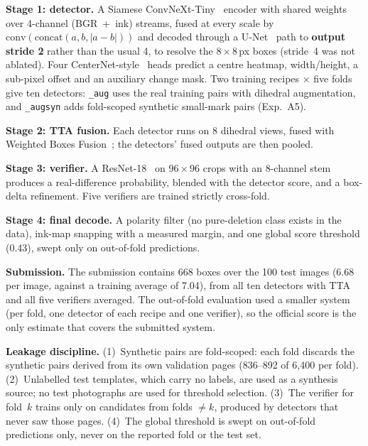 \noindent\textbf{Stage 1: detector.} A Siamese ConvNeXt-Tiny~\cite{liu2022convnext} encoder with
shared weights over 4-channel (BGR~+~ink) streams, fused at every scale by
$\mathrm{conv}(\mathrm{concat}(a,b,|a-b|))$ and decoded through a
U-Net~\cite{ronneberger2015unet} path to \textbf{output stride 2} rather than the usual
4, to resolve the $8\times8$\,px boxes (stride~4 was not ablated). Four
CenterNet-style~\cite{zhou2019centernet} heads predict a centre heatmap, width/height,
a sub-pixel offset and an auxiliary change mask. Two training recipes $\times$ five
folds give ten detectors: \texttt{\_aug} uses the real training pairs with dihedral
augmentation, and \texttt{\_augsyn} adds fold-scoped synthetic small-mark pairs
(Exp.~A5).

\noindent\textbf{Stage 2: TTA fusion.} Each detector runs on 8 dihedral views, fused with Weighted
Boxes Fusion~\cite{solovyev2021wbf}; the detectors' fused outputs are then pooled.

\noindent\textbf{Stage 3: verifier.} A ResNet-18~\cite{he2016resnet} on $96\times96$ crops with an
8-channel stem produces a real-difference probability, blended with the detector
score, and a box-delta refinement. Five verifiers are trained strictly cross-fold.

\noindent\textbf{Stage 4: final decode.} A polarity filter (no pure-deletion class exists in the
data), ink-map snapping with a measured margin, and one global score threshold (0.43),
swept only on out-of-fold predictions.

\noindent\textbf{Submission.} The submission contains 668 boxes over the 100 test
images (6.68 per image, against a training average of 7.04), from all ten detectors
with TTA and all five verifiers averaged. The out-of-fold evaluation used a smaller
system (per fold, one detector of each recipe and one verifier), so the official score
is the only estimate that covers the submitted system.

\noindent\textbf{Leakage discipline.} (1)~Synthetic pairs are fold-scoped: each fold
discards the synthetic pairs derived from its own validation pages (836--892 of
6{,}400 per fold). (2)~Unlabelled test templates, which carry no labels, are used as a
synthesis source; no test photographs are used for threshold selection. (3)~The verifier for fold~$k$ trains only on candidates from folds
$\neq k$, produced by detectors that never saw those pages. (4)~The global threshold is
swept on out-of-fold predictions only, never on the reported fold or the test set.

